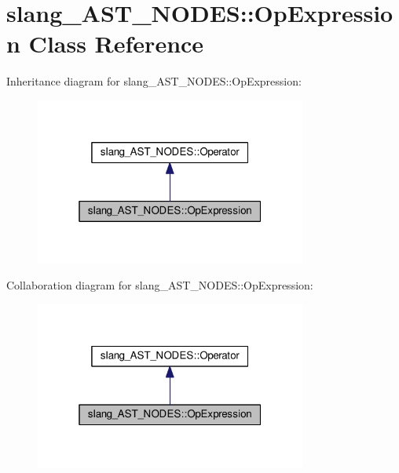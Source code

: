\hypertarget{classslang__AST__NODES_1_1OpExpression}{}\section{slang\+\_\+\+A\+S\+T\+\_\+\+N\+O\+D\+ES\+:\+:Op\+Expression Class Reference}
\label{classslang__AST__NODES_1_1OpExpression}


Inheritance diagram for slang\+\_\+\+A\+S\+T\+\_\+\+N\+O\+D\+ES\+:\+:Op\+Expression\+:
\nopagebreak
\begin{figure}[H]
\begin{center}
\leavevmode
\includegraphics[width=253pt]{classslang__AST__NODES_1_1OpExpression__inherit__graph}
\end{center}
\end{figure}


Collaboration diagram for slang\+\_\+\+A\+S\+T\+\_\+\+N\+O\+D\+ES\+:\+:Op\+Expression\+:
\nopagebreak
\begin{figure}[H]
\begin{center}
\leavevmode
\includegraphics[width=253pt]{classslang__AST__NODES_1_1OpExpression__coll__graph}
\end{center}
\end{figure}
